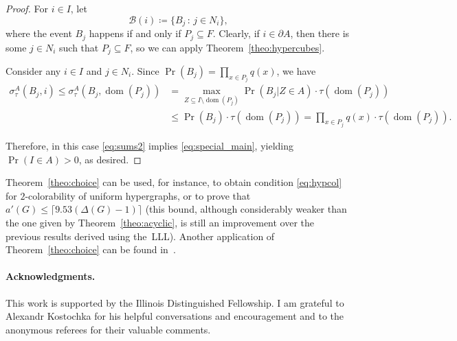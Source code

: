 \documentclass[10pt]{article}
\numberwithin{equation}{subsection}
\theoremstyle{definition}
\begin{document}
\begin{proof}
		For $i \in I$, let
		$$
			\mathcal{B}(i) \coloneqq \{B_j \,:\, j \in N_i\},
		$$
		where the event $B_j$ happens if and only if $P_j \subseteq F$. Clearly, if $i \in \partial A$, then there is some $j \in N_i$ such that $P_j \subseteq F$, so we can apply Theorem~\ref{theo:hypercubes}.
		
		Consider any $i \in I$ and $j \in N_i$. Since $\Pr(B_j) = \prod_{x \in P_j} q(x)$, we have
		\begin{align*}
			\sigma^A_\tau(B_j, i) \leq \sigma^A_\tau(B_j, \operatorname{dom}(P_j)) &= \max_{Z \subseteq I \setminus \operatorname{dom}(P_j)}\Pr(B_j \vert Z \in A) \cdot \tau(\operatorname{dom}(P_j)) \\
			&\leq \Pr(B_j) \cdot \tau(\operatorname{dom}(P_j)) = \prod_{x \in P_j} q(x) \cdot \tau(\operatorname{dom}(P_j)).
		\end{align*}
		
		Therefore, in this case \eqref{eq:sums2} implies \eqref{eq:special_main}, yielding $\Pr\left(I \in A\right) > 0$, as desired.
	\end{proof}
	
	Theorem~\ref{theo:choice} can be used, for instance, to obtain condition \eqref{eq:hypcol} for $2$-colorability of uniform hypergraphs, or to prove that $a'(G) \leq \lceil 9.53(\Delta(G) - 1) \rceil$ (this bound, although considerably weaker than the one given by Theorem~\ref{theo:acyclic}, is still an improvement over the previous results derived using the~LLL). Another application of Theorem~\ref{theo:choice} can be found in~\cite{Bernshteyn2}.
	
	\paragraph{Acknowledgments.}
	This work is supported by the Illinois Distinguished Fellowship.
	I am grateful to Alexandr Kostochka for his helpful conversations and encouragement and to the anonymous referees for their valuable comments.
	
\end{document}

